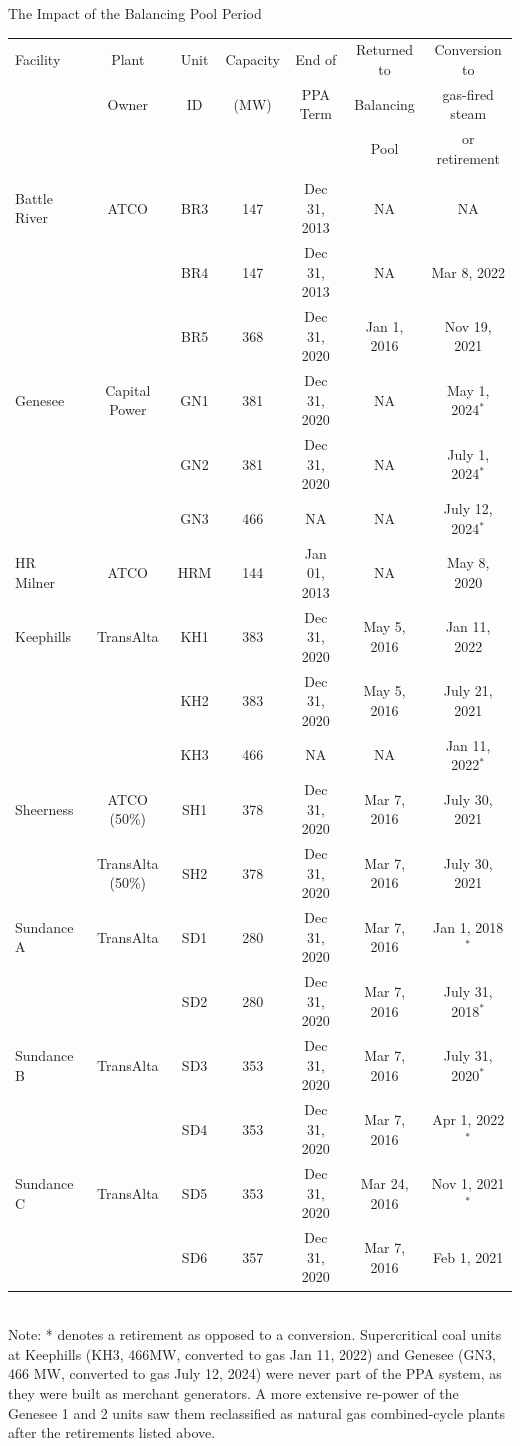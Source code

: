 \documentclass[aspectratio=169]{beamer}
\renewcommand{\(}{\begin{columns}}
\renewcommand{\)}{\end{columns}}
\newcommand{\<}[1]{\begin{column}{#1}}
\renewcommand{\>}{\end{column}}
\begin{document}
\begin{frame}{The Impact of the Balancing Pool Period}
\begin{table}[!h]
\vspace{-0.5cm}
\tiny
\begin{tabular}{lcccccc}
\\[0.5ex]\hline
Facility&Plant&Unit& Capacity& End of& Returned to&Conversion to\\
&Owner&         ID   &  (MW) &  PPA Term &Balancing&gas-fired steam\\
&&                 &    &      & Pool&or retirement\\[+0.5ex]
\hline \\[-1.5ex]
Battle River& ATCO& BR3 &147& Dec 31, 2013&NA&NA\\
&&BR4 &147& Dec 31, 2013&NA&Mar 8, 2022\\
&&BR5 &368& Dec 31, 2020&Jan 1, 2016&Nov 19, 2021\\[+0.75ex]
Genesee &Capital Power &GN1 &381 &Dec 31, 2020&NA&May 1, 2024$^*$\\
&&GN2 &381 &Dec 31, 2020&NA&July 1, 2024$^*$\\
&&GN3 &466 &NA&NA&July 12, 2024$^*$\\[+0.75ex]
HR Milner &ATCO& HRM& 144& Jan 01, 2013&NA&May 8, 2020\\[+0.75ex]
Keephills& TransAlta & KH1 &383& Dec 31, 2020&May 5, 2016&Jan 11, 2022\\
&&KH2& 383& Dec 31, 2020&May 5, 2016&July 21, 2021\\
&&KH3 &466 &NA&NA&Jan 11, 2022$^*$\\[+0.75ex]
Sheerness &ATCO (50\%) & SH1& 378& Dec 31, 2020&Mar 7, 2016&July 30, 2021\\
&TransAlta (50\%)&SH2& 378& Dec 31, 2020&Mar 7, 2016&July 30, 2021\\[+0.75ex]
Sundance A &TransAlta&  SD1 &280& Dec 31, 2020&Mar 7, 2016&Jan 1, 2018$^*$\\
&&SD2 &280& Dec 31, 2020&Mar 7, 2016&July 31, 2018$^*$\\[+0.75ex]
Sundance B &TransAlta & SD3& 353& Dec 31, 2020&Mar 7, 2016&July 31, 2020$^*$\\
&&SD4 &353 &Dec 31, 2020&Mar 7, 2016&Apr 1, 2022$^*$\\[+0.75ex]
Sundance C &TransAlta& SD5& 353& Dec 31, 2020&Mar 24, 2016&Nov 1, 2021$^*$\\
&&SD6& 357& Dec 31, 2020&Mar 7, 2016&Feb 1, 2021\\[+0.75ex]
  \hline
\end{tabular}\\
Note: * denotes a retirement as opposed to a conversion. Supercritical coal units at Keephills (KH3, 466MW, converted to gas Jan 11, 2022) and Genesee (GN3, 466 MW, converted to gas July 12, 2024) were never part of the PPA system, as they were built as merchant generators. A more extensive re-power of the Genesee 1 and 2 units saw them reclassified as natural gas combined-cycle plants after the retirements listed above. 
\end{table}
   \vfill
\end{frame}
\end{document}
